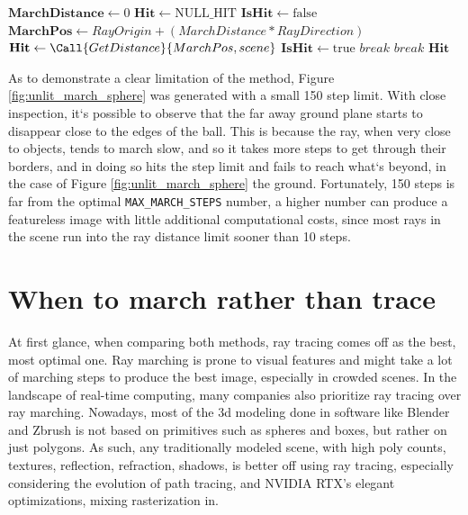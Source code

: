 \begin{algorithm}[H]
\caption{MarchRay}
\label{alg:marchray}
\begin{algorithmic}[1]
    \State $ \mathbf{MarchDistance} \gets \text{0} $
    \State $ \mathbf{Hit} \gets \text{NULL\_HIT} $
    \State $ \mathbf{IsHit} \gets \text{false} $
        \State $\mathbf{MarchPos} \gets  RayOrigin+ (MarchDistance * RayDirection) $
        \State $\mathbf{Hit} \gets \Call{GetDistance}{MarchPos, scene}$
            \State $ \mathbf{IsHit} \gets \text{true} $
            \State $ break $
        \EndIf
            \State $ break $
        \EndIf
    \EndFor
    \State \Return $\mathbf{Hit}$
\EndProcedure
\end{algorithmic}
\end{algorithm}

As to demonstrate a clear limitation of the method, Figure \ref{fig:unlit_march_sphere} was generated with a small 150 step limit. With close inspection, it`s possible to observe that the far away ground plane starts to disappear close to the edges of the ball. This is because the ray, when very close to objects, tends to march slow, and so it takes more steps to get through their borders, and in doing so hits the step limit and fails to reach what`s beyond, in the case of Figure \ref{fig:unlit_march_sphere} the ground. Fortunately, 150 steps is far from the optimal \texttt{MAX\_MARCH\_STEPS} number, a higher number can produce a featureless image with little additional computational costs, since most rays in the scene run into the ray distance limit sooner than 10 steps.

\section{When to march rather than trace}

At first glance, when comparing both methods, ray tracing comes off as the best, most optimal one. Ray marching is prone to visual features and might take a lot of marching steps to produce the best image, especially in crowded scenes. In the landscape of real-time computing, many companies also prioritize ray tracing over ray marching. Nowadays, most of the 3d modeling done in software like Blender and Zbrush is not based on primitives such as spheres and boxes, but rather on just polygons. As such, any traditionally modeled scene, with high poly counts, textures, reflection, refraction, shadows, is better off using ray tracing, especially considering the evolution of path tracing, and NVIDIA RTX's elegant optimizations, mixing rasterization in.


